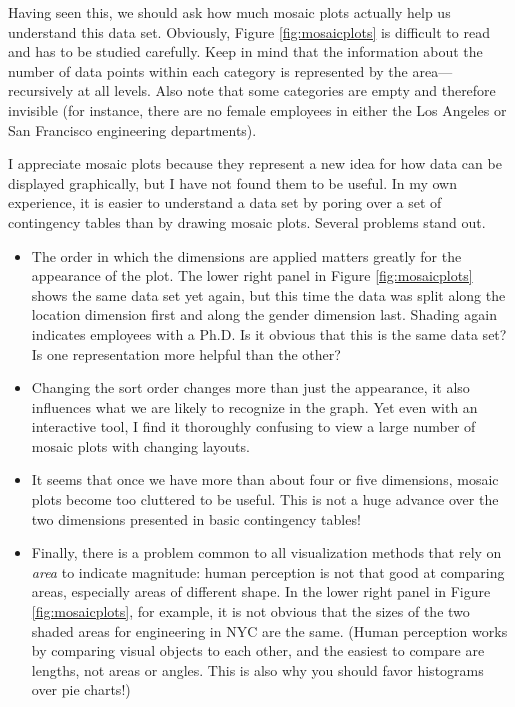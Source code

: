 Having seen this, we should ask how much mosaic plots actually help us
understand this data set.  Obviously, Figure \ref{fig:mosaicplots} is
difficult to read and has to be studied carefully. Keep in mind that
the information about the number of data points within each category
is represented by the area---recursively at all levels. Also note that
some categories are empty and therefore invisible (for instance, there
are no female employees in either the Los Angeles or San Francisco
engineering departments).

I appreciate mosaic plots because they represent a new idea for how
data can be displayed graphically, but I have not found them to be
useful.  In my own experience, it is easier to understand a data set
by poring over a set of contingency tables than by drawing mosaic
plots.  Several problems stand out.

\begin{itemize}
\item The order in which the dimensions are applied matters greatly
  for the appearance of the plot. The lower right panel in Figure
  \ref{fig:mosaicplots} shows the same data set yet again, but this
  time the data was split along the location dimension first and
  along the gender dimension last.  Shading again indicates employees
  with a Ph.D. Is it obvious that this is the same data set? Is one
  representation more helpful than the other?
\item Changing the sort order changes more than just the appearance, it
  also influences what we are likely to recognize in the graph. Yet
  even with an interactive tool, I find it thoroughly confusing to
  view a large number of mosaic plots with changing layouts. 
\item It seems that once we have more than about four or five
  dimensions, mosaic plots become too cluttered to be useful. This is
  not a huge advance over the two dimensions presented in basic
  contingency tables!
\item Finally, there is a problem common to all visualization methods
  that rely on \emph{area} to indicate magnitude: human perception is
  not that good at comparing areas, especially areas of different
  shape. In the lower right panel in Figure \ref{fig:mosaicplots}, for
  example, it is not obvious that the sizes of the two shaded areas
  for engineering in NYC are the same. (Human perception works by
  comparing visual objects to each other, and the easiest to compare
  are lengths, not areas or angles. This is also why you should favor
  histograms over pie charts!)
\end{itemize}

